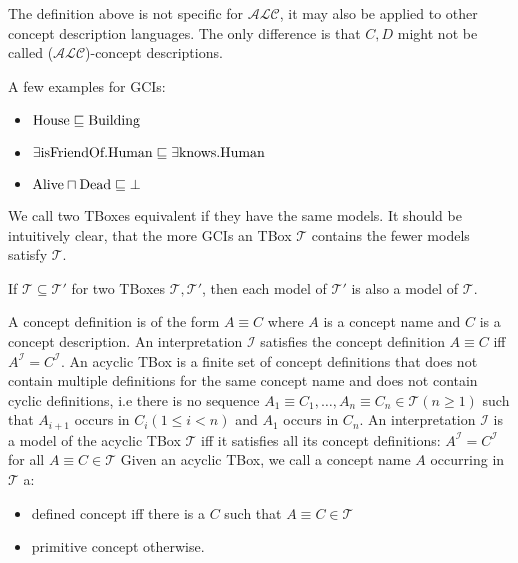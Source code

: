 \begin{note}
	The definition above is not specific for $\mathcal{ALC}$, it may also be applied to other concept description languages.
	The only difference is that $C, D$ might not be called ($\mathcal{ALC}$)-concept descriptions.
\end{note}

\begin{example}
	A few examples for GCIs:
	 \begin{itemize}
		 \item $ \var{House} \sqsubseteq \var{Building}$
		\item $\exists \var{isFriendOf}.\var{Human} \sqsubseteq \exists \var{knows}. \var{Human}$
		\item $\var{Alive} \sqcap \var{Dead} \sqsubseteq \bot$ 
	\end{itemize}
\end{example}

We call two TBoxes equivalent if they have the same models.
It should be intuitively clear, that the more GCIs an TBox $\mathcal{T}$ contains the fewer models satisfy $\mathcal{T}$.

\begin{lemma}
	If $\mathcal{T} \subseteq \mathcal{T}'$ for two TBoxes $\mathcal{T}, \mathcal{T}'$, then each model of $\mathcal{T}'$ is also a model of $\mathcal{T}$.
\end{lemma}

\begin{definition}
	A concept definition is of the form $A \equiv C$ where $A$ is a concept name and  $C$ is a concept description.
	An interpretation $\mathcal{I}$ satisfies the concept definition $A \equiv C$ iff $A^{\mathcal{I}} = C^{\mathcal{I}}$.
	\newline
	An acyclic TBox is a finite set of concept definitions that does not contain multiple definitions for the same concept name and
	does not contain cyclic definitions, i.e there is no sequence $A_1 \equiv C_1, \ldots, A_n \equiv C_n \in \mathcal{T} (n \geq 1)$ such that
	$A_{i+1}$ occurs in $C_i (1 \leq i < n)$ and $A_1$ occurs in $C_{n}$. 
	\newline
	An interpretation $\mathcal{I}$ is a model of the acyclic TBox $\mathcal{T}$ iff it satisfies all its concept definitions: $A^{\mathcal{I}} = C^{\mathcal{I}}$ for all $A \equiv C \in \mathcal{T}$
	Given an acyclic TBox, we call a concept name $A$ occurring in $\mathcal{T}$ a:
	\begin{itemize}
		\item defined concept iff there is a $C$ such that $A \equiv C \in \mathcal{T}$ 
		\item primitive concept otherwise.
	\end{itemize}
\end{definition}
